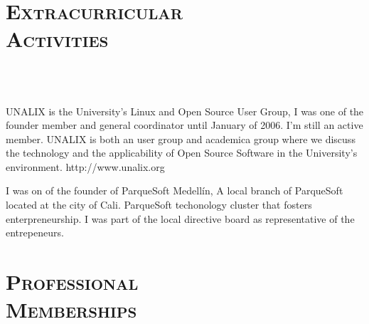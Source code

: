 \begin{resume}




\section{\textsc{Extracurricular\\ Activities}}

\begin{formatb}
  \\
  \body\\
\end{formatb}

\begin{position}
UNALIX is the University's Linux and Open Source User Group, I was one
of the founder member  and general coordinator until January of
2006. I'm still an active member. UNALIX is both an user group and academica group where we
discuss the technology and the applicability of Open Source Software
in the University's environment. http://www.unalix.org
\end{position}

\begin{position}
I was on of the founder of ParqueSoft Medell\'{i}n, A local branch of
ParqueSoft located at the city of Cali. ParqueSoft techonology cluster
that fosters enterpreneurship. I was part of the local directive board
as representative of the entrepeneurs.

\end{position}




\section{\textsc{Professional\\ Memberships}}

\begin{formatb}
  \\
  \body\\
\end{formatb}


\end{resume}
